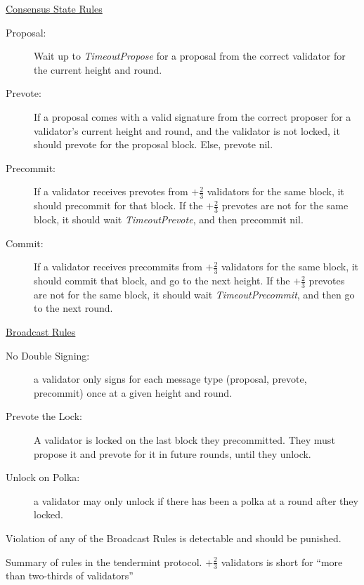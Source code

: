 
\underline{Consensus State Rules}
\begin{description}
	\item[Proposal:] Wait up to \emph{TimeoutPropose} for a proposal from the correct validator for the current height and round.
	\item[Prevote:]  If a proposal comes with a valid signature from the correct proposer for a validator’s current height and round, and the validator is not locked, it should prevote for the proposal block. Else, prevote nil.
	\item[Precommit:] If a validator receives prevotes from $+\frac{2}{3}$ validators for the same block, it should precommit for that block. If the $+\frac{2}{3}$ prevotes are not for the same block, it should wait \emph{TimeoutPrevote}, and then precommit nil.
	\item[Commit:] If a validator receives precommits from $+\frac{2}{3}$ validators for the same block, it should commit that block, and go to the next height.  If the $+\frac{2}{3}$ prevotes are not for the same block, it should wait \emph{TimeoutPrecommit}, and then go to the next round.
\end{description}

\underline{Broadcast Rules}
\begin{description}
	\item[No Double Signing:] a validator only signs for each message type (proposal, prevote, precommit) once at a given height and round.
	\item[Prevote the Lock:] A validator is locked on the last block they precommitted. They must propose it and prevote for it in future rounds, until they unlock.
	\item[Unlock on Polka:] a validator may only unlock if there has been a polka at a round after they locked.
\end{description}
Violation of any of the Broadcast Rules is detectable and should be punished.

\caption[Summary of Tendermint protocol rules]{Summary of rules in the tendermint protocol. 
$+\frac{2}{3}$ validators is short for ``more than two-thirds of validators''}
